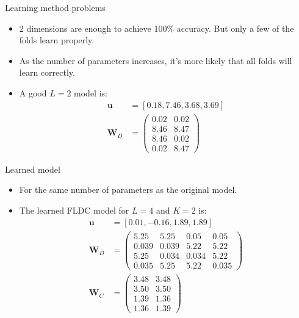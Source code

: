 \documentclass{beamer}
\begin{document}
\begin{frame}{Learning method problems}
  \begin{itemize}
    \item 2 dimensions are enough to achieve 100\% accuracy. But only a few of the folds learn properly.
    \item As the number of parameters increases, it's more likely that all folds will learn correctly.
    \item A good $L=2$ model is:
      \begin{align*}
      \mathbf{u} &= [0.18,7.46,3.68,3.69] \\
      \mathbf{W}_{D} &= \left( \begin{array}{cc}
      0.02 & 0.02 \\
      8.46 & 8.47 \\
      8.46 & 0.02 \\
      0.02 & 8.47 \end{array} \right)
      \end{align*}
  \end{itemize}
\end{frame}

\begin{frame}{Learned model}
  \begin{itemize}
    \item For the same number of parameters as the original model.
    \item The learned FLDC model for $L=4$ and $K=2$ is:
      \begin{align*}
      \mathbf{u} &= [0.01,-0.16,1.89,1.89] \\
      \mathbf{W}_{D} &= \left( \begin{array}{cccc}
      5.25 & 5.25 & 0.05 & 0.05 \\
      0.039 & 0.039 & 5.22 & 5.22 \\
      5.25 & 0.034 & 0.034 & 5.22 \\
      0.035 & 5.25 & 5.22 & 0.035 \end{array} \right) \\
      \mathbf{W}_{C} &= \left( \begin{array}{cc}
      3.48 & 3.48 \\
      3.50 & 3.50  \\
      1.39 & 1.36 \\
      1.36 & 1.39 \end{array} \right)
      \end{align*}
  \end{itemize}
\end{frame}

%  
%  
\end{document}
